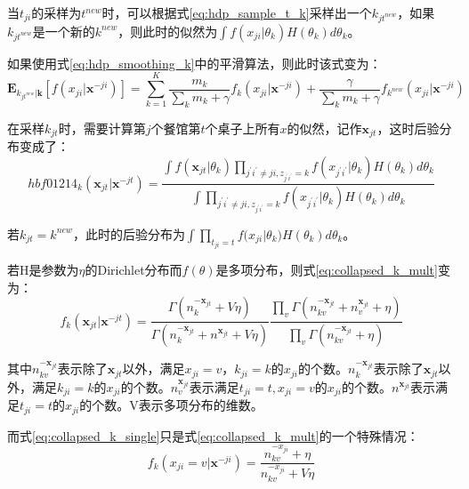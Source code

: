 当$t_{ji}$的采样为$t^{new}$时，可以根据式\eqref{eq:hdp_sample_t_k}采样出一个$k_{jt^{new}}$，如果$k_{jt^{new}}$是一个新的$k^{new}$，则此时的似然为$\int f(x_{ji}|\theta_k)H(\theta_k) d\theta_k$。

如果使用式\eqref{eq:hdp_smoothing_k}中的平滑算法，则此时该式变为：
\begin{equation}
{\bm E}_{k_{jt^{new}}|{\bm k}}[f(x_{ji}|{\bm x}^{-ji})] = \sum_{k=1}^{K} {\frac{m_k}{\sum_{k} m_k + \gamma}f_k(x_{ji}|{\bm x}^{-ji}) } +\frac{\gamma}{ \sum_{k}m_k + \gamma}f_{k^{new}}(x_{ji}|{\bm x}^{-ji})
\end{equation}

在采样$k_{jt}$时，需要计算第$j$个餐馆第$t$个桌子上所有$x$的似然，记作${\bm x}_{jt}$，这时后验分布变成了：
\begin{equation} hbf01214_k({\bm x}_{jt}|{\bm x}^{-jt}) = \frac{\int f({\bm x}_{jt}|\theta_k)\prod_{{j^\prime}{i^\prime}\neq ji,z_{{j^\prime}{i^\prime}}=k}f(x_{{j^\prime}{i^\prime}}|\theta_k)H(\theta_k) d\theta_k}{\int \prod_{{j^\prime}{i^\prime}\neq ji,z_{{j^\prime}{i^\prime}}=k}f(x_{{j^\prime}{i^\prime}}|\theta_k)H(\theta_k) d\theta_k}  \label{eq:collapsed_k_mult}
\end{equation}

若$k_{jt}=k^{new}$，此时的后验分布为$\int \prod_{t_{ji}=t}{f(x_{ji}}|\theta_k)H(\theta_k) d\theta_k$。

若H是参数为$\eta$的Dirichlet分布而$f(\theta)$是多项分布，则式\eqref{eq:collapsed_k_mult}变为：
\begin{equation}
f_k({\bm x}_{jt}|{\bm x}^{-jt}) = \frac{\Gamma(n_{k}^{-{\bm x}_{jt}} + V\eta)} {\Gamma(n_{k}^{-{\bm x}_{jt}} + n^{{\bm x}_{jt}} + V\eta)} \frac{\prod_v\Gamma(n_{kv}^{-{\bm x}_{jt}} + n_v^{{\bm x}_{jt}} + \eta)} {\prod_v\Gamma(n_{kv}^{-{\bm x}_{jt}}  + \eta)} \label{eq:collapsed_k_mult_r} 
\end{equation}

其中$n_{kv}^{-{\bm x}_{jt}}$表示除了${\bm x}_{jt}$以外，满足$x_{ji}=v，k_{ji} = k$的$x_{ji}$的个数。$n_{k}^{-{\bm x}_{jt}}$表示除了${\bm x}_{jt}$以外，满足$k_{ji} = k$的$x_{ji}$的个数。$n_{v}^{{\bm x}_{jt}}$表示满足$t_{ji}=t, x_{ji}=v$的$x_{ji}$的个数。$n^{{\bm x}_{jt}}$表示满足$t_{ji}=t$的$x_{ji}$的个数。V表示多项分布的维数。

而式\eqref{eq:collapsed_k_single}只是式\eqref{eq:collapsed_k_mult}的一个特殊情况：
\begin{equation}
f_k(x_{ji}=v|{\bm x}^{-ji}) = \frac{n_{kv}^{-x_{ji}} + \eta}{n_{kv}^{-x_{ji}} + V\eta}\label{eq:collapsed_k_single_r} 
\end{equation}

